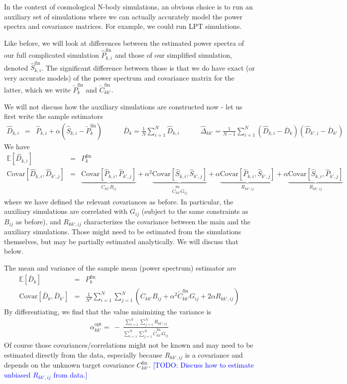 \documentclass{aastex6}
\newcommand{\eqn}[1]{\begin{eqnarray}#1\end{eqnarray}}
\newcommand{\todo}[1]{\textcolor{blue}{[TODO: #1]}}
\begin{document}
In the context of cosmological N-body simulations, an obvious choice is to run an auxiliary set of simulations where we can actually accurately model the power spectra and covariance matrices. 
For example, we could run LPT simulations.

Like before, we will look at differences between the estimated power spectra of our full complicated simulation $\hat{P}^\mathrm{fin}_{k, i} $ and those of our simplified simulation, denoted $\hat{S}^\mathrm{fin}_{k, i}$. 
The significant difference between those is that  we do have exact (or very accurate models) of the power spectrum and covariance matrix for the latter, which we write $\tilde{P}^\mathrm{fin}_k$ and $\tilde{C}_{kk'}^\mathrm{fin}$.

We will not discuss how the auxiliary simulations are constructed now - let us first write the sample estimators
\eqn{
	\hat{D}_{k, i} &=&  \hat{P}_{k, i} + \alpha (\hat{S}_{k, i} - \tilde{P}^\mathrm{fin}_k)  \quad \quad\quad
	\bar{D}_k =	\frac{1}{N} \sum_{i=1}^N	\hat{D}_{k, i}	\quad \quad\quad
	\hat{\Delta}_{kk'} = \frac{1}{N-1} \sum_{i=1}^N \left( \hat{D}_{k, i} - \bar{D}_{k} \right) \left( \hat{D}_{k', i} - \bar{D}_{k'} \right)
}
We have 
\eqn{
	\mathbb{E}[\hat{D}_{k, i}] &=& {P}^\mathrm{fin}_k 	\\	
	\mathrm{Covar}[\hat{D}_{k, i}, \hat{D}_{k', j}] &=& \underbrace{\mathrm{Covar}[\hat{P}_{k, i}, \hat{P}_{k', j}]}_{C_{kk'} B_{ij}}  + \alpha^2 \underbrace{\mathrm{Covar}[\hat{S}_{k, i}, \hat{S}_{k', j}] }_{\tilde{C}_{kk'}^\mathrm{fin} G_{ij}} + \alpha \underbrace{\mathrm{Covar}[\hat{P}_{k, i}, \hat{S}_{k', j}]}_{ R_{kk', ij}} + \alpha \underbrace{\mathrm{Covar}[\hat{S}_{k, i}, \hat{P}_{k', j}]}_{ R_{kk', ij}} 
}
where we have defined the relevant covariances as before. In particular, the auxiliary simulations are correlated with $G_{ij}$ (subject to the same constraints as $B_{ij}$ as before), and $ R_{kk', ij}$ characterizes the covariance between the main and the auxiliary simulations. 
Those might need to be estimated from the simulations themselves, but may be partially estimated analytically.
We will discuss that below.

The mean and variance of the sample mean (power spectrum) estimator are
\eqn{
	\mathbb{E}[\bar{D}_{k}] &=& {P}^\mathrm{fin}_k 	\\	
	\mathrm{Covar}[\bar{D}_{k}, \bar{D}_{k'}] &=& \frac{1}{N^2}\sum_{i=1}^N\sum_{j=1}^N \left( C_{kk'} B_{ij} + \alpha^2  \tilde{C}_{kk'}^\mathrm{fin} G_{ij} + 2 \alpha  R_{kk', ij}  \right)
}
By differentiating, we find that the value minimizing the variance is
\eqn{
	{\alpha^\mathrm{opt}_{kk'}} = \ - \ \frac{ \sum_{i=1}^N\sum_{j=1}^N  R_{kk', ij} }{ \sum_{i=1}^N\sum_{j=1}^N \tilde{C}_{kk'}^\mathrm{fin} G_{ij} }
}
Of course those covariances/correlations might not be known and may need to be estimated directly from the data, especially because $R_{kk', ij}$ is a covariance and depends on the unknown target	 covariance ${C}_{kk'}^\mathrm{fin}$.
\todo{Discuss how to estimate unbiased $ R_{kk', ij}$ from data.}
\end{document}
